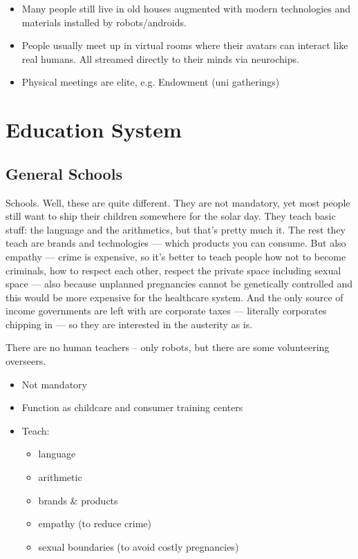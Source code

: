 \documentclass[12pt]{article}
\begin{document}
\begin{itemize}
  \item Many people still live in old houses augmented with modern technologies and materials installed by robots/androids.
  \item People usually meet up in virtual rooms where their avatars can interact like real humans. All streamed directly to their minds via neurochips.
  \item Physical meetings are elite, e.g. Endowment (uni gatherings)
\end{itemize}

\section{Education System}
\subsection{General Schools}

Schools. Well, these are quite different. They are not mandatory, yet most people still want to ship their children somewhere for the solar day. They teach basic stuff: the language and the arithmetics, but that’s pretty much it. The rest they teach are brands and technologies — which products you can consume. But also empathy — crime is expensive, so it's better to teach people how not to become criminals, how to respect each other, respect the private space including sexual space — also because unplanned pregnancies cannot be genetically controlled and this would be more expensive for the healthcare system. And the only source of income governments are left with are corporate taxes — literally corporates chipping in — so they are interested in the austerity as is.

There are no human teachers -- only robots, but there are some volunteering overseers.

\begin{itemize}
  \item Not mandatory
  \item Function as childcare and consumer training centers
  \item Teach:
  \begin{itemize}
    \item language
    \item arithmetic
    \item brands \& products
    \item empathy (to reduce crime)
    \item sexual boundaries (to avoid costly pregnancies)
  \end{itemize}
\end{itemize}
\end{document}
